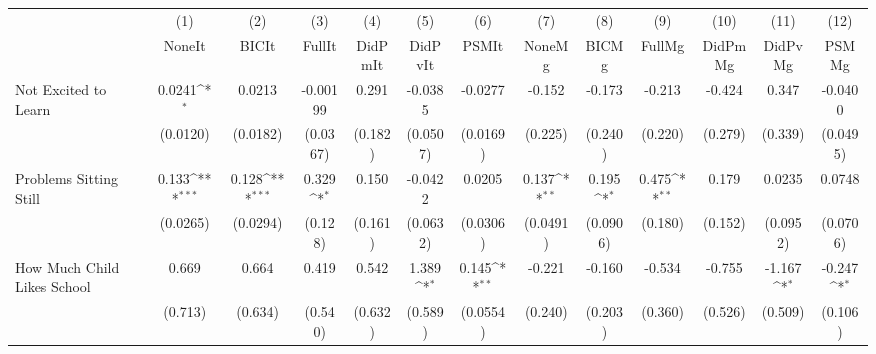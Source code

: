 {
\def\sym#1{\ifmmode^{#1}\else\(^{#1}\)\fi}
\begin{tabular}{l*{12}{c}}
\toprule
            &\multicolumn{1}{c}{(1)}&\multicolumn{1}{c}{(2)}&\multicolumn{1}{c}{(3)}&\multicolumn{1}{c}{(4)}&\multicolumn{1}{c}{(5)}&\multicolumn{1}{c}{(6)}&\multicolumn{1}{c}{(7)}&\multicolumn{1}{c}{(8)}&\multicolumn{1}{c}{(9)}&\multicolumn{1}{c}{(10)}&\multicolumn{1}{c}{(11)}&\multicolumn{1}{c}{(12)}\\
            &\multicolumn{1}{c}{NoneIt}&\multicolumn{1}{c}{BICIt}&\multicolumn{1}{c}{FullIt}&\multicolumn{1}{c}{DidPmIt}&\multicolumn{1}{c}{DidPvIt}&\multicolumn{1}{c}{PSMIt}&\multicolumn{1}{c}{NoneMg}&\multicolumn{1}{c}{BICMg}&\multicolumn{1}{c}{FullMg}&\multicolumn{1}{c}{DidPmMg}&\multicolumn{1}{c}{DidPvMg}&\multicolumn{1}{c}{PSMMg}\\
\midrule
Not Excited to Learn&      0.0241\sym{*}  &      0.0213         &    -0.00199         &       0.291         &     -0.0385         &     -0.0277         &      -0.152         &      -0.173         &      -0.213         &      -0.424         &       0.347         &     -0.0400         \\
            &    (0.0120)         &    (0.0182)         &    (0.0367)         &     (0.182)         &    (0.0507)         &    (0.0169)         &     (0.225)         &     (0.240)         &     (0.220)         &     (0.279)         &     (0.339)         &    (0.0495)         \\
\addlinespace
Problems Sitting Still&       0.133\sym{***}&       0.128\sym{***}&       0.329\sym{*}  &       0.150         &     -0.0422         &      0.0205         &       0.137\sym{**} &       0.195\sym{*}  &       0.475\sym{**} &       0.179         &      0.0235         &      0.0748         \\
            &    (0.0265)         &    (0.0294)         &     (0.128)         &     (0.161)         &    (0.0632)         &    (0.0306)         &    (0.0491)         &    (0.0906)         &     (0.180)         &     (0.152)         &    (0.0952)         &    (0.0706)         \\
\addlinespace
How Much Child Likes School&       0.669         &       0.664         &       0.419         &       0.542         &       1.389\sym{*}  &       0.145\sym{**} &      -0.221         &      -0.160         &      -0.534         &      -0.755         &      -1.167\sym{*}  &      -0.247\sym{*}  \\
            &     (0.713)         &     (0.634)         &     (0.540)         &     (0.632)         &     (0.589)         &    (0.0554)         &     (0.240)         &     (0.203)         &     (0.360)         &     (0.526)         &     (0.509)         &     (0.106)         \\

\end{tabular}}
